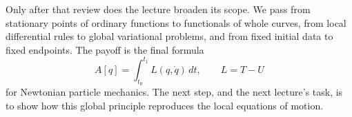 Only after that review does the lecture broaden its scope. We pass from stationary points of ordinary functions to functionals of whole curves, from local differential rules to global variational problems, and from fixed initial data to fixed endpoints. The payoff is the final formula
\begin{equation}
A[q]=\int_{t_0}^{t_1}L(q,\dot q)\,dt,
\qquad
L=T-U
\end{equation}
for Newtonian particle mechanics. The next step, and the next lecture's task, is to show how this global principle reproduces the local equations of motion.